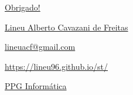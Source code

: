 \documentclass[10pt,
  aspectratio=169,
  serif,
  mathserif,
  professionalfont,
  compress,
  handout,
  ]{beamer}\usepackage[]{graphicx}\usepackage[]{color}
\begin{document}

\begin{frame}[c, allowframebreaks]

\begin{center}

  {\huge \href{https://lineu96.github.io/st/}{Obrigado!}}
  
  \vspace{0.5cm}
    
  {\normalsize \href{https://lineu96.github.io/st/}{Lineu Alberto Cavazani de Freitas}}
  
  {\normalsize \href{https://lineu96.github.io/st/}{lineuacf@gmail.com}}
  
  {\normalsize \href{https://lineu96.github.io/st/}{https://lineu96.github.io/st/}}
  
  {\normalsize \href{http://www.prppg.ufpr.br/ppginformatica/?lang=pb}{PPG Informática}}


\begin{figure} %
\end{figure} %

\end{center}

\end{frame}
\end{document}

